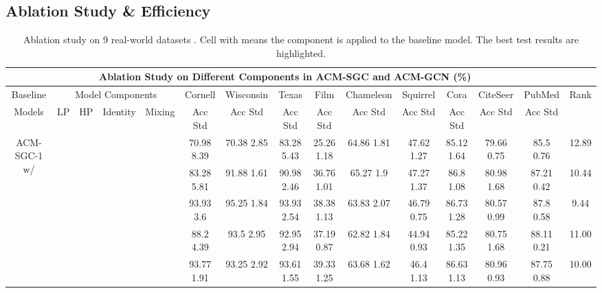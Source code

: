 \documentclass{article}
\newcommand{\0}{{\boldsymbol{0}}}
\newcommand{\6}{{\partial}}
\newcommand{\8}{{\infty}}
\newcommand{\4}{{\nabla}}
\begin{document}
\subsection{Ablation Study \& Efficiency}
\vspace{-0.1cm}
\label{sec:ablation_tests_running_time}
\begin{table*}[htbp]
  \centering
  \tiny
  \caption{Ablation study on 9 real-world datasets \cite{pei2020geom}. Cell with \checkmark means the component is applied to the baseline model. The best test results are highlighted.}
  \label{tab:ablation_study}
  \setlength{\tabcolsep}{1pt}
    \begin{tabular}{c|cccc|ccccccccc|r}
    \toprule
    \toprule
    \multicolumn{14}{c}{Ablation Study on Different Components in ACM-SGC and ACM-GCN (\%)}                       &  \\
    \midrule
    \multicolumn{1}{p{4.125em}|}{Baseline    } & \multicolumn{4}{c|}{Model Components} & Cornell & Wisconsin & Texas & Film  & Chameleon & Squirrel & Cora  & CiteSeer & PubMed & \multicolumn{1}{c}{\multirow{1}[4]{*}{Rank}} \\
\cmidrule{2-14}    \multicolumn{1}{p{4.125em}|}{Models} & LP    & HP    & Identity & Mixing & Acc  Std & Acc  Std & Acc  Std & Acc  Std & Acc  Std & Acc  Std & Acc  Std & Acc  Std & Acc  Std &  \\
    \midrule
    \multicolumn{1}{c|}{\multirow{5}[1]{*}{ACM-SGC-1 w/}} &  &       &       &       & 70.98  8.39 & 70.38  2.85 & 83.28  5.43 & 25.26  1.18 & 64.86  1.81 & 47.62  1.27 & 85.12  1.64 & 79.66  0.75 & 85.5  0.76 & \multicolumn{1}{c}{12.89} \\
          &  &  &       &  & 83.28  5.81 & 91.88  1.61 & 90.98  2.46 & 36.76  1.01 & 65.27  1.9 & 47.27  1.37 & 86.8  1.08 & 80.98  1.68 & 87.21  0.42 & \multicolumn{1}{c}{10.44} \\
          &  &       &  &  & 93.93  3.6 & 95.25  1.84 & 93.93  2.54 & 38.38  1.13 & 63.83  2.07 & 46.79  0.75 & 86.73  1.28 & 80.57  0.99 & 87.8  0.58 & \multicolumn{1}{c}{9.44} \\
          &  &  &  &       & 88.2  4.39 & 93.5  2.95 & 92.95  2.94 & 37.19  0.87 & 62.82  1.84 & 44.94  0.93 & 85.22  1.35 & 80.75  1.68 & 88.11  0.21 & \multicolumn{1}{c}{11.00} \\
          &  &  &  &  & 93.77  1.91 & 93.25  2.92 & 93.61  1.55 & 39.33  1.25 & 63.68  1.62 & 46.4  1.13 & 86.63  1.13 & 80.96  0.93 & 87.75  0.88 & \multicolumn{1}{c}{10.00} \\
          \midrule

\end{tabular}
\end{table*}
\end{document}
